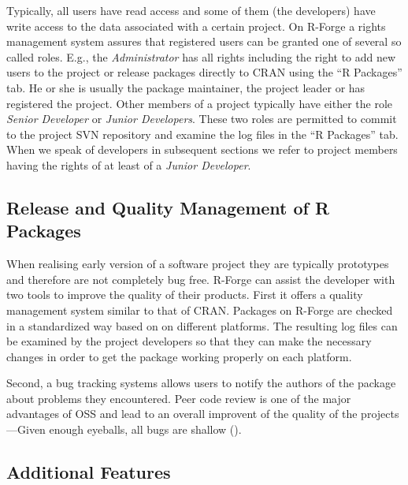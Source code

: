 Typically, all users have read access and some of them (the
developers) have write access to the data associated with
a certain project. On R-Forge a rights management system assures that
registered users can be granted one of several so called roles. 
E.g., the \textit{Administrator} has all rights including the right to
add new users to the project or release packages directly to CRAN
using the ``R Packages'' tab. He or she is usually the package
maintainer, the project leader or has registered the project.
Other members of a project typically have either the role \textit{Senior 
Developer} or \textit{Junior Developers}. These two roles are
permitted to commit to the project 
SVN repository and examine the log files in the ``R Packages'' tab.
When we speak of developers in subsequent sections we refer to project
members having the rights of at least of a \textit{Junior Developer}.


\subsection{Release and Quality Management of R Packages}

When realising early version of a software project they are typically
prototypes and therefore are 
not completely bug free. R-Forge can assist the developer with two
tools to improve the quality of their products. First it offers a
quality management system similar to 
that of CRAN. Packages on R-Forge are checked in a
standardized way based on  on different
platforms. The resulting log files can be examined by the project
developers so that they can make the necessary changes in order to get
the package working properly on each platform.

Second, a bug tracking systems allows users  to notify
the authors of the package about problems they encountered. 
Peer code review is one of the major advantages of OSS and lead to an
overall improvent of the quality of the projects---Given
enough eyeballs, all bugs are shallow (\cite{forge:Raymond:1999}).

\subsection{Additional Features}

